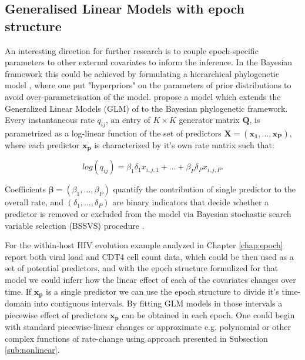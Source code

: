 \subsection{Generalised Linear Models with epoch structure}

An interesting direction for further research is to couple epoch-specific parameters to other external covariates to inform the inference.
In the Bayesian framework this could be achieved by formulating a hierarchical phylogenetic model \citep{Edo-Matas2011}, where one put "hyperpriors" on the parameters of prior distributions to avoid over-parametrisation of the model.
\citet{Lemey2014} propose a model which extends the Generalized Linear Models (GLM) of \citet{Nelder1972} to the Bayesian phylogenetic framework.
Every instantaneous rate $q_{ij}$, an entry of $K \times K$ generator matrix $\mathbf{Q}$, is parametrized as a log-linear function of the set of predictors $\mathbf{X}=\left( \mathbf{x_{1}},\ldots,\mathbf{x_{P}}\right)$, where each predictor $\mathbf{x_{p}}$ is characterized by it's own rate matrix such that:

\begin{equation}
log(q_{ij})=\beta_{1}\delta_{1}x_{i,j,1}+\ldots+\beta_{P}\delta_{P}x_{i,j,P}.
\label{eq:glm}
\end{equation}

Coefficients $\mathbf{\beta}=\left(\beta_{1},\ldots,\beta_{P}\right)$ quantify the contribution of single predictor to the overall rate, and $\left(\delta_{1},\ldots,\delta_{P}\right)$ are binary indicators that decide whether a predictor is removed or excluded from the model via Bayesian stochastic search variable selection (BSSVS) procedure \citep{Kuo1998,Lemey2009}.

For the within-host HIV evolution example analyzed in Chapter \ref{chap:epoch} \citet{Shankarappa99} report both viral load and CDT4 cell count data, which could be then used as a set of potential predictors, and with the epoch structure formulized for that model we could inferr how the linear effect of each of the covariates changes over time.
If $\mathbf{x_{p}}$ is a single predictor we can use the epoch structure to divide it's time-domain into contiguous intervals.
By fitting GLM models in those intervals a piecewise effect of predictors $\mathbf{x_{p}}$ can be obtained in each epoch. 
One could begin with standard piecewise-linear changes or approximate e.g. polynomial or other complex functions of rate-change using approach presented in Subsection \ref{sub:nonlinear}.

